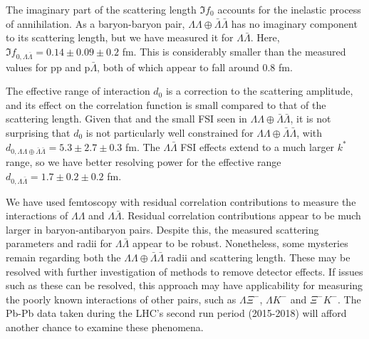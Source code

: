 The imaginary part of the scattering length $\Im f_0$ accounts for the inelastic process of annihilation.
As a baryon-baryon pair, $\Lambda\Lambda\oplus\bar{\Lambda}\bar{\Lambda}$ has no imaginary component to its scattering length, but we have measured it for $\Lambda\bar{\Lambda}$.
Here, $\Im f_{0,\Lambda\bar{\Lambda}} = 0.14 \pm 0.09 \pm 0.2$ fm.
This is considerably smaller than the measured values for p$\mathrm{p}$ and p$\bar{\Lambda}$, both of which appear to fall around 0.8 fm.

The effective range of interaction $d_0$ is a correction to the scattering amplitude, and its effect on the correlation function is small compared to that of the scattering length.
Given that and the small FSI seen in $\Lambda\Lambda\oplus\bar{\Lambda}\bar{\Lambda}$, it is not surprising that $d_0$ is not particularly well constrained for $\Lambda\Lambda\oplus\bar{\Lambda}\bar{\Lambda}$, with $d_{0,\Lambda\Lambda\oplus\bar{\Lambda}\bar{\Lambda}} = 5.3 \pm 2.7 \pm 0.3$ fm.
The $\Lambda\bar{\Lambda}$ FSI effects extend to a much larger $k^*$ range, so we have better resolving power for the effective range $d_{0,\Lambda\bar{\Lambda}} = 1.7 \pm 0.2 \pm 0.2$ fm.



We have used femtoscopy with residual correlation contributions to measure the interactions of $\Lambda\Lambda$ and $\Lambda\bar{\Lambda}$.
Residual correlation contributions appear to be much larger in baryon-antibaryon pairs.
Despite this, the measured scattering parameters and radii for $\Lambda\bar{\Lambda}$ appear to be robust.
Nonetheless, some mysteries remain regarding both the $\Lambda\Lambda\oplus\bar{\Lambda}\bar{\Lambda}$ radii and scattering length.
These may be resolved with further investigation of methods to remove detector effects.
If issues such as these can be resolved, this approach may have applicability for measuring the poorly known interactions of other pairs, such as $\Lambda\Xi^-$, $\Lambda K^-$ and $\Xi^-K^-$.
The Pb-Pb data taken during the LHC's second run period (2015-2018) will afford another chance to examine these phenomena.


